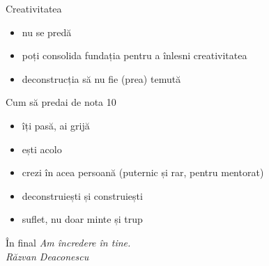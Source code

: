 \documentclass{beamer}
\begin{document}
\begin{frame}{Creativitatea}
  \begin{itemize}
    \pause
    \item nu se predă
    \pause
    \item poți consolida fundația pentru a înlesni creativitatea
    \pause
    \item deconstrucția să nu fie (prea) temută
  \end{itemize}
\end{frame}

\begin{frame}{Cum să predai de nota 10}
  \begin{itemize}
    \pause
    \item îți pasă, ai grijă
    \pause
    \item ești acolo
    \pause
    \item crezi în acea persoană (puternic și rar, pentru mentorat)
    \pause
    \item deconstruiești și construiești
    \pause
    \item suflet, nu doar minte și trup
  \end{itemize}
\end{frame}

\begin{frame}{În final}
  \pause
  \centering
  \LARGE{\textit{Am încredere în tine.}} \\
  \vspace{3mm}
  \hfill \normalsize{\textit{Răzvan Deaconescu}} \\
\end{frame}
\end{document}
